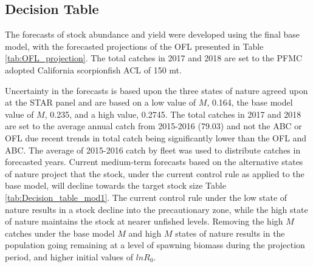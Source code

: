 \documentclass[12pt,]{article}
\begin{document}
\FloatBarrier

\subsection*{Decision Table}\label{decision-table}

The forecasts of stock abundance and yield were developed using the
final base model, with the forecasted projections of the OFL presented
in Table \ref{tab:OFL_projection}. The total catches in 2017 and 2018
are set to the PFMC adopted California scorpionfish ACL of 150 mt.

Uncertainty in the forecasts is based upon the three states of nature
agreed upon at the STAR panel and are based on a low value of \(M\),
0.164, the base model value of \(M\), 0.235, and a high value, 0.2745.
The total catches in 2017 and 2018 are set to the average annual catch
from 2015-2016 (79.03) and not the ABC or OFL due recent trends in total
catch being significantly lower than the OFL and ABC. The average of
2015-2016 catch by fleet was used to distribute catches in forecasted
years. Current medium-term forecasts based on the alternative states of
nature project that the stock, under the current control rule as applied
to the base model, will decline towards the target stock size Table
\ref{tab:Decision_table_mod1}. The current control rule under the low
state of nature results in a stock decline into the precautionary zone,
while the high state of nature maintains the stock at nearer unfished
levels. Removing the high \(M\) catches under the base model \(M\) and
high \(M\) states of nature results in the population going remaining at
a level of spawning biomass during the projection period, and higher
initial values of \(lnR_0\).
\end{document}
